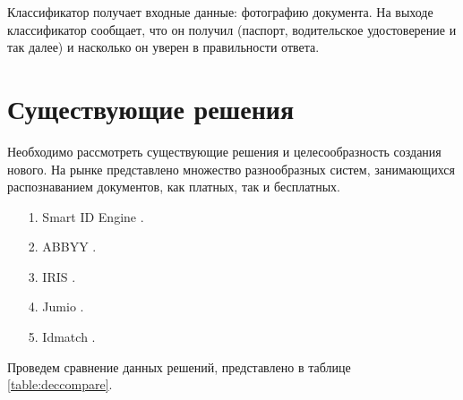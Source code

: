 Классификатор получает входные данные: фотографию документа. На выходе классификатор сообщает, что он получил (паспорт, водительское удостоверение и так далее) и насколько он уверен в правильности ответа.

\section{Существующие решения}

Необходимо рассмотреть существующие решения и целесообразность создания нового. На рынке представлено множество разнообразных систем, занимающихся распознаванием документов, как платных, так и бесплатных.

\begin{enumerate}
\item[1.] Smart ID Engine \cite{smartengine}.

\item[2.] ABBYY \cite{abbyy}.

\item[3.] IRIS \cite{iris}.

\item[4.] Jumio \cite{jumio}.

\item[5.] Idmatch \cite{idmatch}.
\end{enumerate}

Проведем сравнение данных решений, представлено в таблице \ref{table:deccompare}.

